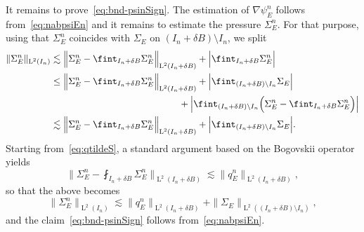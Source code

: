 \documentclass[10pt]{amsart}
\theoremstyle{plain}
\theoremstyle{definition}
\newcommand{\Ld}{\operatorname{L}}
\begin{document}
It remains to prove~\eqref{eq:bnd-psinSign}. The estimation of $\nabla\psi_E^n$ follows from~\eqref{eq:nabpsiEn} and it remains to estimate the pressure $\Sigma_E^n$. For that purpose, using that $\Sigma_E^n$ coincides with $\Sigma_E$ on $(I_n+\delta B)\setminus I_n$, we split
\begin{align*}
\|\Sigma_E^n\|_{\Ld^2(I_n)}
&\lesssim \Big\|\Sigma_E^n-\fint_{I_n+\delta B}\Sigma_E^n\Big\|_{\Ld^2(I_n+\delta B)}+\Big|\fint_{I_n+\delta B}\Sigma_E^n\Big|\\
&\le \Big\|\Sigma_E^n-\fint_{I_n+\delta B}\Sigma_E^n\Big\|_{\Ld^2(I_n+\delta B)}+\Big|\fint_{(I_n+\delta B)\setminus I_n}\Sigma_E\Big|\\
&\hspace{4.83cm}+\Big|\fint_{(I_n+\delta B)\setminus I_n}\Big(\Sigma_E^n-\fint_{I_n+\delta B}\Sigma_E^n\Big)\Big|\\
&\lesssim \Big\|\Sigma_E^n-\fint_{I_n+\delta B}\Sigma_E^n\Big\|_{\Ld^2(I_n+\delta B)}+\Big|\fint_{(I_n+\delta B)\setminus I_n}\Sigma_E\Big|.
\end{align*}
Starting from~\eqref{eq:qtildeS}, a standard argument based on the Bogovskii operator yields
\begin{equation*}
\Big\|\Sigma_E^n-\fint_{I_n+\delta B}\Sigma_E^n\Big\|_{\Ld^2(I_n+\delta B)}\lesssim \|q_E^n\|_{\Ld^2(I_n+\delta B)},
\end{equation*}
so that the above becomes
\[\|\Sigma_E^n\|_{\Ld^2(I_n)}\lesssim \|q_E^n\|_{\Ld^2(I_n+\delta B)}+\|\Sigma_E\|_{\Ld^2((I_n+\delta B)\setminus I_n)},\]
and the claim~\eqref{eq:bnd-psinSign} follows from~\eqref{eq:nabpsiEn}.
\end{document}

